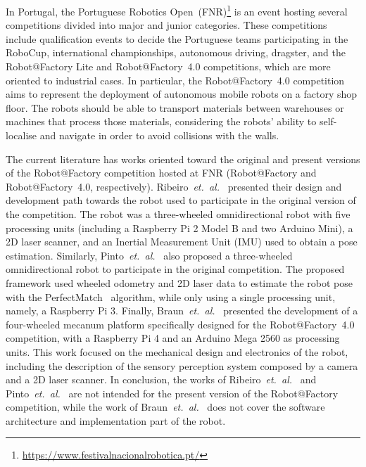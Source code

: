 \documentclass[conference]{IEEEtran}
\newcommand{\etal}{\textit{et.~al.}}
\begin{document}
In Portugal, the Portuguese Robotics Open~(FNR)\footnote{\label{note:fnr}\url{https://www.festivalnacionalrobotica.pt/}} is an event hosting several competitions divided into major and junior categories.
These competitions include qualification events to decide the Portuguese teams participating in the RoboCup, international championships, autonomous driving, dragster, and the Robot@Factory Lite and Robot@Factory~4.0 competitions, which are more oriented to industrial cases.
In particular, the Robot@Factory~4.0 competition aims to represent the deployment of autonomous mobile robots on a factory shop floor. The robots should be able to transport materials between warehouses or machines that process those materials, considering the robots' ability to self-localise and navigate in order to avoid collisions with the walls.

The current literature has works oriented toward the original and present versions of the Robot@Factory competition hosted at FNR (Robot@Factory and Robot@Factory~4.0, respectively).
Ribeiro~\etal~\cite{literature:ratf:ribeiro-2017} presented their design and development path towards the robot used to participate in the original version of the competition.
The robot was a three-wheeled omnidirectional robot with five processing units (including a Raspberry Pi 2 Model B and two Arduino Mini), a 2D laser scanner, and an Inertial Measurement Unit (IMU) used to obtain a pose estimation.
Similarly, Pinto~\etal~\cite{literature:ratf:pinto-2023} also proposed a three-wheeled omnidirectional robot to participate in the original competition.
The proposed framework used wheeled odometry and 2D laser data to estimate the robot pose with the PerfectMatch~\cite{literature:ratf:pinto-2023:perfect-match} algorithm, while only using a single processing unit, namely, a Raspberry Pi 3.
Finally, Braun~\etal~\cite{literature:ratf:braun-2024} presented the development of a four-wheeled mecanum platform specifically designed for the Robot@Factory~4.0 competition, with a Raspberry Pi 4 and an Arduino Mega 2560 as processing units. 
This work focused on the mechanical design and electronics of the robot, including the description of the sensory perception system composed by a camera and a 2D laser scanner.
In conclusion, the works of Ribeiro~\etal~\cite{literature:ratf:ribeiro-2017} and Pinto~\etal~\cite{literature:ratf:pinto-2023} are not intended for the present version of the Robot@Factory competition, while the work of Braun~\etal~\cite{literature:ratf:braun-2024} does not cover the software architecture and implementation part of the robot.
\end{document}
